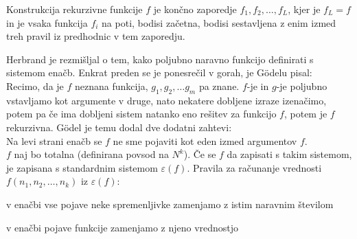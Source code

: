 \documentclass[10pt,a4paper,oneside]{book}
\begin{document}
Konstrukcija rekurzivne funkcije $f$ je končno zaporedje $f_1,f_2,\dots,f_L$, kjer je $f_L=f$ in je vsaka funkcija $f_i$ na poti, bodisi začetna, bodisi sestavljena z enim izmed treh pravil iz predhodnic v tem zaporedju. %


Herbrand je rezmišljal o tem, kako poljubno naravno funkcijo definirati s sistemom enačb. Enkrat preden se je ponesrečil v gorah, je Gödelu pisal:\\
Recimo, da je $f$ neznana funkcija, $g_1, g_2, \dots g_m$ pa znane. %
$f$-je in $g$-je poljubno vstavljamo kot argumente v druge, nato nekatere dobljene izraze izenačimo, potem pa če ima dobljeni sistem natanko eno rešitev za funkcijo $f$, potem je $f$ rekurzivna.
\br
Gödel je temu dodal dve dodatni zahtevi:\\
Na levi strani enačb se $f$ ne sme pojaviti kot eden izmed argumentov $f$.\\%
$f$ naj bo totalna (definirana povsod na $N^k$).
\br
Če se $f$ da zapisati s takim sistemom, je zapisana s standardnim sistemom $\varepsilon(f)$.
\br
Pravila za računanje vrednosti $f(n_1, n_2, \dots, n_k)$ iz $\varepsilon(f)$:
\begin{items}
\item v enačbi vse pojave neke spremenljivke zamenjamo z istim naravnim številom
\item v enačbi pojave funkcije zamenjamo z njeno vrednostjo
\end{items}


\end{document}
